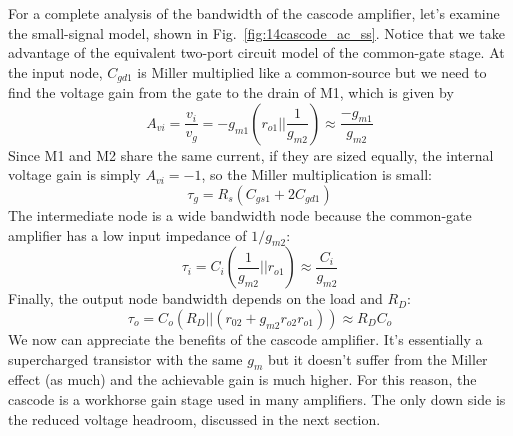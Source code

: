For a complete analysis of the bandwidth of the cascode amplifier, let's examine the small-signal model, shown in Fig.~\ref{fig:14cascode_ac_ss}.  Notice that we take advantage of the equivalent two-port circuit model of the common-gate stage.   At the input node, $C_{gd1}$ is Miller multiplied like a common-source but we need to find the voltage gain from the gate to the drain of M1, which is given by
 \begin{equation}
	A_{vi} = \frac{v_i}{v_g} = -g_{m1} \left( r_{o1} || \frac{1}{g_{m2}} \right) 
	\approx \frac{-g_{m1}}{g_{m2}}
\end{equation}
Since M1 and M2 share the same current, if they are sized equally, the internal voltage gain is simply $A_{vi} = -1$, so the Miller multiplication is small:
 \begin{equation}
	\tau_g = R_{s} (C_{gs1} + 2 C_{gd1})
\end{equation}
The intermediate node is a wide bandwidth node because the common-gate amplifier has a low input impedance of $1/g_{m2}$:
 \begin{equation}
	\tau_i = C_i \left(\frac{1}{g_{m2}} || r_{o1}  \right) \approx \frac{C_i}{g_{m2}}
\end{equation}  
Finally, the output node bandwidth depends on the load and $R_D$:
 \begin{equation}
	\tau_o = C_o (R_D || (r_{02} + g_{m2}r_{o2} r_{o1})) \approx R_D C_o
\end{equation}
We now can appreciate the benefits of the cascode amplifier.  It's essentially a supercharged transistor with the same $g_m$ but it doesn't suffer from the Miller effect (as much) and the achievable gain is much higher.  For this reason, the cascode is a workhorse gain stage used in many amplifiers.  The only down side is the reduced voltage headroom, discussed in the next section.
